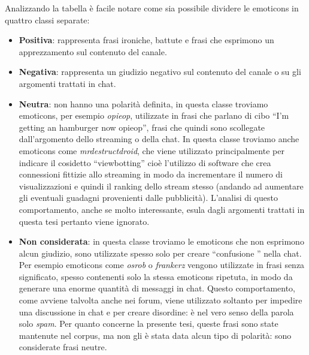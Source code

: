 \documentclass[a4paper,12pt,openright,twoside]{report}
\theoremstyle{definition}
\begin{document}
Analizzando la tabella è facile notare come sia possibile dividere le emoticons in quattro classi separate:
\begin{itemize}
\item \textbf{Positiva}: rappresenta frasi ironiche, battute e frasi che esprimono un apprezzamento sul contenuto del canale.
\item \textbf{Negativa}: rappresenta un giudizio negativo sul contenuto del canale o su gli argomenti trattati in chat.
\item \textbf{Neutra}: non hanno una polarità definita, in questa classe troviamo emoticons, per esempio \emph{opieop}, utilizzate in frasi che parlano di 
cibo ``I'm getting an hamburger now opieop'', frasi che quindi sono scollegate dall'argomento dello streaming o della chat. 
In questa classe troviamo anche emoticons come \emph{mrdestructdroid}, che viene utilizzato principalmente per indicare il cosidetto ``viewbotting'' 
cioè l'utilizzo di software che crea connessioni fittizie allo streaming in modo da incrementare il numero di visualizzazioni 
e quindi il ranking dello stream stesso (andando ad aumentare gli eventuali guadagni provenienti dalle pubblicità). 
L'analisi di questo comportamento, anche se molto interessante, esula dagli argomenti trattati in questa tesi pertanto viene ignorato.
\item \textbf{Non considerata}: in questa classe troviamo le emoticons che non esprimono alcun giudizio, sono utilizzate spesso solo per creare ``confusione '' nella chat.
Per esempio emoticons come \emph{osrob} o \emph{frankerz} vengono utilizzate in frasi senza significato, spesso contenenti solo la stessa emoticons ripetuta,
in modo da generare una enorme quantità di messaggi in chat. Questo comportamento, come avviene talvolta anche nei forum, viene utilizzato 
soltanto per impedire una discussione in chat e per creare disordine: è nel vero senso della parola solo \emph{spam}. 
Per quanto concerne la presente tesi,
queste frasi sono state mantenute nel corpus, ma non gli è stata data alcun tipo di polarità: sono considerate frasi neutre.
\end{itemize}
\end{document}
